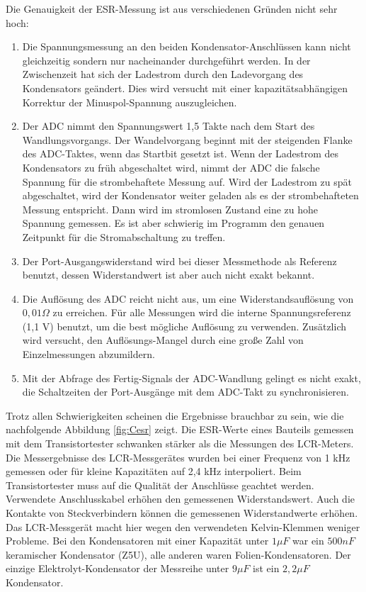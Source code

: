 Die Genauigkeit der ESR-Messung ist aus verschiedenen Gründen nicht sehr hoch:
\begin{enumerate}
\item Die Spannungsmessung an den beiden Kondensator-Anschlüssen kann nicht gleichzeitig sondern nur nacheinander durchgeführt werden.
 In der Zwischenzeit hat sich der Ladestrom durch den Ladevorgang des Kondensators geändert.
Dies wird versucht mit einer kapazitätsabhängigen Korrektur der Minuspol-Spannung auszugleichen.
\item Der ADC nimmt den Spannungswert 1,5 Takte nach dem Start des Wandlungsvorgangs. Der Wandelvorgang beginnt mit
der steigenden Flanke des ADC-Taktes, wenn das Startbit gesetzt ist. Wenn der Ladestrom des Kondensators zu früh abgeschaltet wird,
nimmt der ADC die falsche Spannung für die strombehaftete Messung auf. Wird der Ladestrom zu spät abgeschaltet, wird
der Kondensator weiter geladen als es der strombehafteten Messung entspricht.
Dann wird im stromlosen Zustand eine zu hohe Spannung gemessen.
Es ist aber schwierig im Programm den genauen Zeitpunkt für die Stromabschaltung zu treffen.
\item Der Port-Ausgangswiderstand wird bei dieser Messmethode als Referenz benutzt, dessen Widerstandwert
ist aber auch nicht exakt bekannt.
\item Die Auflösung des ADC reicht nicht aus, um eine Widerstandsauflösung von \(0,01 \Omega\) zu erreichen.
Für alle Messungen wird die interne Spannungsreferenz (1,1 V) benutzt, um die best mögliche Auflösung zu verwenden.
Zusätzlich wird versucht, den Auflösungs-Mangel durch eine große Zahl von Einzelmessungen abzumildern.
\item Mit der Abfrage des Fertig-Signals der ADC-Wandlung gelingt es nicht exakt, die Schaltzeiten der Port-Ausgänge mit dem
ADC-Takt zu synchronisieren.
\end{enumerate}

Trotz allen Schwierigkeiten scheinen die Ergebnisse brauchbar zu sein, wie die nachfolgende Abbildung \ref{fig:Cesr} zeigt.
Die ESR-Werte eines Bauteils gemessen mit dem Transistortester schwanken stärker als die Messungen des LCR-Meters.
Die Messergebnisse des LCR-Messgerätes wurden bei einer Frequenz von 1 kHz gemessen oder für kleine Kapazitäten auf
2,4 kHz interpoliert.
Beim Transistortester muss auf die Qualität der Anschlüsse geachtet werden. Verwendete Anschlusskabel
erhöhen den gemessenen Widerstandswert. Auch die Kontakte von Steckverbindern können die gemessenen
Widerstandwerte erhöhen. Das LCR-Messgerät macht hier wegen den verwendeten Kelvin-Klemmen weniger Probleme.
Bei den Kondensatoren mit einer Kapazität unter \(1 \mu F\) war ein \(500 nF\) keramischer 
Kondensator (Z5U), alle anderen waren Folien-Kondensatoren. Der einzige Elektrolyt-Kondensator der Messreihe unter \(9 \mu F\)  
ist ein \(2,2 \mu F\) Kondensator.

